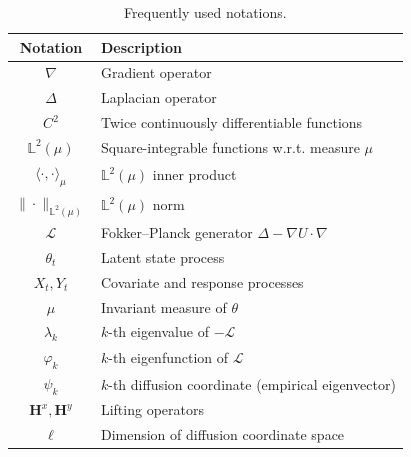 \documentclass[11pt]{article}
\theoremstyle{plain}
\theoremstyle{definition}
\theoremstyle{remark}
\numberwithin{equation}{section}
\renewcommand{\L}{\mathscr{L}}
\newcommand{\bL}{\mathbb{L}}
\begin{document}
\begin{table}[h]
\centering
\begin{tabular}{|c|l|}
\hline 
\textbf{Notation} & \textbf{Description} \\\hline
$\nabla$ & Gradient operator\\
$\Delta$ & Laplacian operator\\ 
$C^2$ & Twice continuously differentiable functions\\
$\mathbb{L}^2(\mu)$ & Square-integrable functions w.r.t. measure $\mu$\\ 
$\langle \cdot,\cdot\rangle_\mu$ & $\mathbb{L}^2(\mu)$ inner product\\
$\|\cdot\|_{\mathbb{L}^2(\mu)}$ & $\mathbb{L}^2(\mu)$ norm\\
$\L$ & Fokker--Planck generator $\Delta - \nabla U \cdot \nabla$\\
$\theta_t$ & Latent state process\\
$X_t, Y_t$ & Covariate and response processes\\
$\mu$ & Invariant measure of $\theta$\\
$\lambda_k$ & $k$-th eigenvalue of $-\L$\\
$\varphi_k$ & $k$-th eigenfunction of $\L$\\
$\psi_k$ & $k$-th diffusion coordinate (empirical eigenvector)\\
$\mathbf{H}^x, \mathbf{H}^y$ & Lifting operators\\
$\ell$ & Dimension of diffusion coordinate space\\
\hline
\end{tabular}
\caption{Frequently used notations.}
\label{tab:notations}
\end{table}

\end{document}
